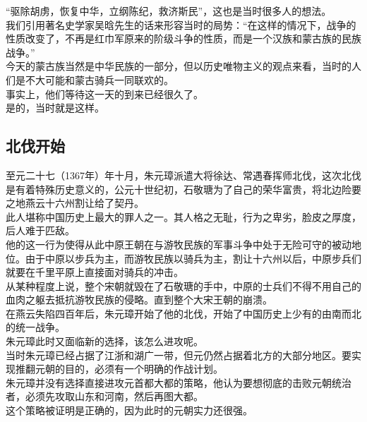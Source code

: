 \begin{multicols}{\theparacolNo}
“驱除胡虏，恢复中华，立纲陈纪，救济斯民”，这也是当时很多人的想法。\\

我们引用著名史学家吴晗先生的话来形容当时的局势：“在这样的情况下，战争的性质改变了，不再是红巾军原来的阶级斗争的性质，而是一个汉族和蒙古族的民族战争。”\\

今天的蒙古族当然是中华民族的一部分，但以历史唯物主义的观点来看，当时的人们是不大可能和蒙古骑兵一同联欢的。\\

事实上，他们等待这一天的到来已经很久了。\\

是的，当时就是这样。\\

\subsection{北伐开始}
至元二十七（1367年）年十月，朱元璋派遣大将徐达、常遇春挥师北伐，这次北伐是有着特殊历史意义的，公元十世纪初，石敬瑭为了自己的荣华富贵，将北边险要之地燕云十六州割让给了契丹。\\

此人堪称中国历史上最大的罪人之一。其人格之无耻，行为之卑劣，脸皮之厚度，后人难于匹敌。\\

他的这一行为使得从此中原王朝在与游牧民族的军事斗争中处于无险可守的被动地位。由于中原以步兵为主，而游牧民族以骑兵为主，割让十六州以后，中原步兵们就要在千里平原上直接面对骑兵的冲击。\\

从某种程度上说，整个宋朝就毁在了石敬瑭的手中，中原的士兵们不得不用自己的血肉之躯去抵抗游牧民族的侵略。直到整个大宋王朝的崩溃。\\

在燕云失陷四百年后，朱元璋开始了他的北伐，开始了中国历史上少有的由南而北的统一战争。\\

朱元璋此时又面临新的选择，该怎么进攻呢。\\

当时朱元璋已经占据了江浙和湖广一带，但元仍然占据着北方的大部分地区。要实现推翻元朝的目的，必须有一个明确的作战计划。\\

朱元璋并没有选择直接进攻元首都大都的策略，他认为要想彻底的击败元朝统治者，必须先攻取山东和河南，然后再图大都。\\

这个策略被证明是正确的，因为此时的元朝实力还很强。\\


\end{multicols}

